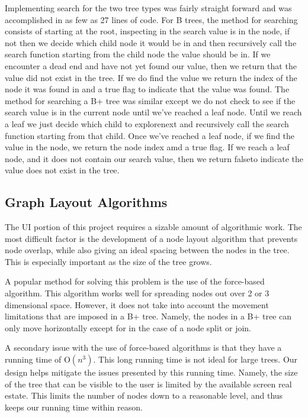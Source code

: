     Implementing search for the two tree types was fairly straight forward and was accomplished in as few as 27 lines of code.  
For B trees, the method for searching consists of starting at the root, inspecting in the search value is in the node, if not 
then we decide which child node it would be in and then recursively call the search function starting from the child node the value 
should be in.  If we encounter a dead end and have not yet found our value, then we return that the value did not exist in the tree.
If we do find the value we return the index of the node it was found in and a true flag to indicate that the value was found.  The 
method for searching a B+ tree was similar except we do not check to see if the search value is in the current node until we've 
reached a leaf node.  Until we reach a leaf we just decide which child to explorenext and recursively call the search function 
starting from that child.  Once we've reached a leaf node, if we find the value in the node, we return the node index amd a true flag.  If we reach a leaf node, and it does not contain our search value, then we return falseto indicate the value does not exist
 in the tree.

\subsection{Graph Layout Algorithms}
The UI portion of this project requires a sizable amount of
algorithmic work. The most difficult factor is the development of a
node layout algorithm that prevents node overlap, while also giving an
ideal spacing between the nodes in the tree. This is especially
important as the size of the tree grows.

A popular method for solving this problem is the use of the
force-based algorithm. This algorithm works well for spreading nodes
out over 2 or 3 dimensional space. However, it does not take into
account the movement limitations that are imposed in a B+
tree. Namely, the nodes in a B+ tree can only move horizontally except
for in the case of a node split or join.

A secondary issue with the use of force-based algorithms is that they
have a running time of O$(n^3)$. This long running time is not ideal
for large trees. Our design helps mitigate the issues presented by
this running time. Namely, the size of the tree that can be visible to
the user is limited by the available screen real estate. This limits
the number of nodes down to a reasonable level, and thus keeps our
running time within reason.

